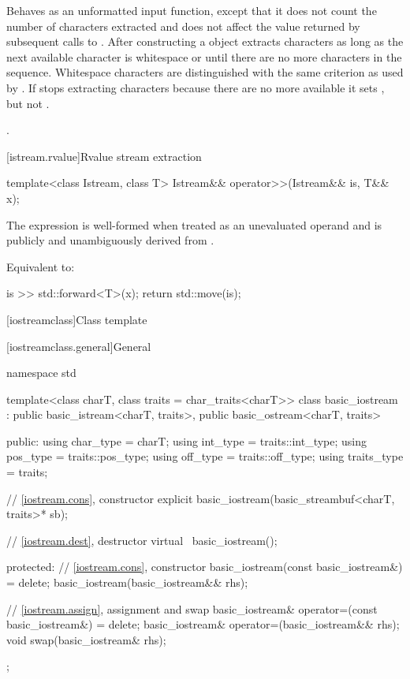 \begin{itemdescr}
\pnum
\effects
Behaves as an unformatted input function, except that it does not count the number of characters extracted and
does not affect the value returned by subsequent calls to . After
constructing a  object extracts characters as long as the next available
character  is whitespace or until there are no more characters in the sequence.
Whitespace characters are distinguished with the same criterion as used by
.
If
stops extracting characters because there are no more available it sets
,
but not
.

\pnum
\returns
{}.
\end{itemdescr}

[istream.rvalue]{Rvalue stream extraction}

%
\begin{itemdecl}
template<class Istream, class T>
  Istream&& operator>>(Istream&& is, T&& x);
\end{itemdecl}

\begin{itemdescr}
\pnum
\constraints
The expression  is well-formed
when treated as an unevaluated operand and
 is publicly and unambiguously derived from .

\pnum
\effects
Equivalent to:
\begin{codeblock}
is >> std::forward<T>(x);
return std::move(is);
\end{codeblock}
\end{itemdescr}

[iostreamclass]{Class template }

[iostreamclass.general]{General}

%
\begin{codeblock}
namespace std {
  template<class charT, class traits = char_traits<charT>>
  class basic_iostream
    : public basic_istream<charT, traits>,
      public basic_ostream<charT, traits> {
  public:
    using char_type   = charT;
    using int_type    = traits::int_type;
    using pos_type    = traits::pos_type;
    using off_type    = traits::off_type;
    using traits_type = traits;

    // \ref{iostream.cons}, constructor
    explicit basic_iostream(basic_streambuf<charT, traits>* sb);

    // \ref{iostream.dest}, destructor
    virtual ~basic_iostream();

  protected:
    // \ref{iostream.cons}, constructor
    basic_iostream(const basic_iostream&) = delete;
    basic_iostream(basic_iostream&& rhs);

    // \ref{iostream.assign}, assignment and swap
    basic_iostream& operator=(const basic_iostream&) = delete;
    basic_iostream& operator=(basic_iostream&& rhs);
    void swap(basic_iostream& rhs);
  };
}
\end{codeblock}

